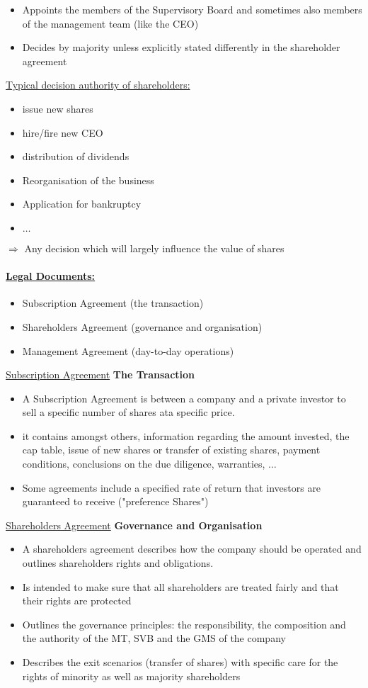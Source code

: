 \documentclass[8pt]{extreport}
\begin{document}
{\begin{itemize}
\item Appoints the members of the Supervisory Board and sometimes also members of the management team (like the CEO)
\item Decides by majority unless explicitly stated differently in the shareholder agreement
\end{itemize}
\underline{Typical decision authority of shareholders:}
\begin{itemize}
\item issue new shares
\item hire/fire new CEO
\item distribution of dividends
\item Reorganisation of the business
\item Application for bankruptcy
\item $\dots$
\end{itemize}
$\Rightarrow$ Any decision which will largely influence the value of shares
\paragraph{\underline{Legal Documents:}}
\begin{itemize}
\item Subscription Agreement (the transaction)
\item Shareholders Agreement (governance and organisation)
\item Management Agreement (day-to-day operations)
 \end{itemize}
\underline{Subscription Agreement} \textbf{The Transaction}
\begin{itemize}
\item A Subscription Agreement is between a company and a private investor to sell a specific number of shares ata specific price.
\item it contains amongst others, information regarding the amount invested, the cap table, issue of new shares or transfer of existing shares, payment conditions, conclusions on the due diligence, warranties, $\dots$
\item Some agreements include a specified rate of return that investors are guaranteed to receive ("preference Shares")
\end{itemize}
\underline{Shareholders Agreement} \textbf{Governance and Organisation}
\begin{itemize}
\item A shareholders agreement describes how the company should be operated and outlines shareholders rights and obligations.
\item Is intended to make sure that all shareholders are treated fairly and that their rights are protected
\item Outlines the governance principles: the responsibility, the composition and the authority of the MT, SVB and the GMS of the company
\item Describes the exit scenarios (transfer of shares) with specific care for the rights of minority as well as majority shareholders
\end{itemize}
}
\end{document}
